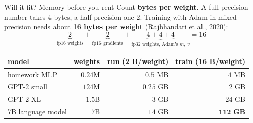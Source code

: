 \documentclass[aspectratio=43]{beamer}
\begin{document}
\begin{frame}{Will it fit? Memory before you rent}
  \small
  Count \textbf{bytes per weight}. A full-precision number takes $4$ bytes, a half-precision
  one $2$. Training with Adam in mixed precision needs about \textbf{16 bytes per weight}
  (Rajbhandari et al., 2020):
  \[
    \underbrace{2}_{\text{fp16 weights}} + \underbrace{2}_{\text{fp16 gradients}} +
    \underbrace{4 + 4 + 4}_{\text{fp32 weights, Adam's } m,\ v} = 16
  \]
  \vskip -2pt
  \begin{center}\footnotesize
  \begin{tabular}{@{}l r r r@{}}
    \textbf{model} & \textbf{weights} & \textbf{run (2 B/weight)} & \textbf{train (16 B/weight)} \\ \hline
    homework MLP & $0.24$M & $0.5$ MB & $4$ MB \\
    GPT-2 small & $124$M & $0.25$ GB & $2$ GB \\
    GPT-2 XL & $1.5$B & $3$ GB & $24$ GB \\
    7B language model & $7$B & $14$ GB & $\mathbf{112}$ \textbf{GB} \\
  \end{tabular}
  \end{center}
  \vfill
\end{frame}
\end{document}
